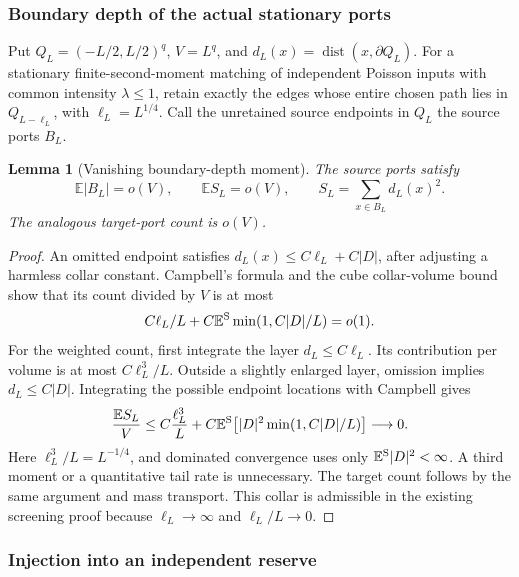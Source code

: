 \documentclass[11pt,reqno]{amsart}
\newtheorem{lemma}[theorem]{Lemma}
\theoremstyle{definition}
\theoremstyle{remark}
\numberwithin{equation}{section}
\newcommand{\E}{\mathbb E}
\begin{document}
\subsubsection{Boundary depth of the actual stationary ports}

Put \(Q_L=(-L/2,L/2)^q\), \(V=L^q\), and
\(d_L(x)=\operatorname{dist}(x,\partial Q_L)\).
For a stationary finite-second-moment matching of independent Poisson
inputs with common intensity \(\lambda\le1\), retain exactly the edges
whose entire chosen path lies in \(Q_{L-\ell_L}\), with
\(\ell_L=L^{1/4}\). Call the unretained source endpoints in \(Q_L\) the
source ports \(B_L\).

\begin{lemma}[Vanishing boundary-depth moment]
\label{strict-screen-depth}
The source ports satisfy
\begin{equation}
\label{strict-screen-depth-moment}
 \E|B_L|=o(V),\qquad
 \E S_L=o(V),\qquad S_L=\sum_{x\in B_L}d_L(x)^2.
\end{equation}
The analogous target-port count is \(o(V)\).
\end{lemma}

\begin{proof}
An omitted endpoint satisfies
\(d_L(x)\le C\ell_L+C|D|\), after adjusting a harmless collar constant.
Campbell's formula and the cube collar-volume bound show that its
count divided by \(V\) is at most
\[
 C\ell_L/L+C\E^{\rm S}\min(1,C|D|/L)=o(1).
\]
For the weighted count, first integrate the layer \(d_L\le C\ell_L\).
Its contribution per volume is at most \(C\ell_L^3/L\). Outside a
slightly enlarged layer, omission implies \(d_L\le C|D|\).
Integrating the possible endpoint locations with Campbell gives
\begin{equation}
\label{strict-screen-depth-estimate}
 \frac{\E S_L}{V}
 \le C\frac{\ell_L^3}{L}
       +C\E^{\rm S}\!\left[
          |D|^2\min(1,C|D|/L)\right]\longrightarrow0.
\end{equation}
Here \(\ell_L^3/L=L^{-1/4}\), and dominated convergence uses only
\(\E^{\rm S}|D|^2<\infty\). A third moment or a quantitative tail
rate is unnecessary. The target count follows by the same argument
and mass transport. This collar is admissible in the existing
screening proof because \(\ell_L\to\infty\) and \(\ell_L/L\to0\).
\end{proof}

\subsubsection{Injection into an independent reserve}
\end{document}
